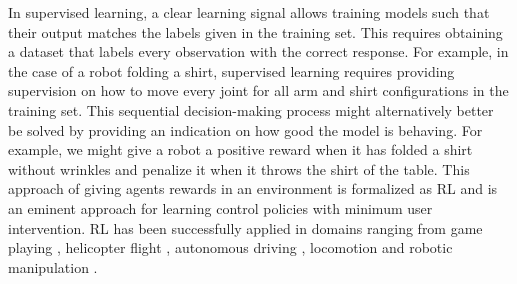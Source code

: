 \documentclass[\home/main.tex]{subfiles}
\begin{document}
In supervised learning, a clear learning signal allows training models such that their output matches the labels given in the training set. This requires obtaining a dataset that labels every observation with the correct response. For example, in the case of a robot folding a shirt, supervised learning requires providing supervision on how to move every joint for all arm and shirt configurations in the training set. This sequential decision-making process might alternatively better be solved by providing an indication on how good the model is behaving. For example, we might give a robot a positive reward when it has folded a shirt without wrinkles and penalize it when it throws the shirt of the table. This approach of giving agents rewards in an environment is formalized as \gls{RL} and is an eminent approach for learning control policies with minimum user intervention. RL has been successfully applied in domains ranging from game playing \autocite{mnih2015human}, helicopter flight \autocite{ng2003autonomous}, autonomous driving \autocite{sallab2017deep}, locomotion \autocite{tan2018sim} and robotic manipulation \autocite{levine2016end}.
\end{document}
